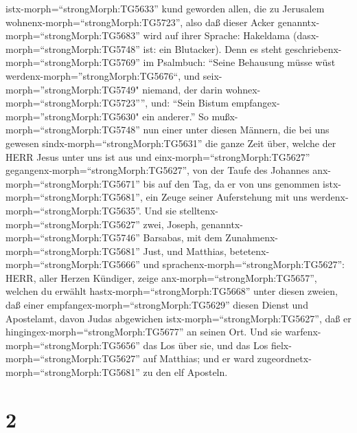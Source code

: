 istx-morph=``strongMorph:TG5633'' kund geworden allen, die zu Jerusalem
wohnenx-morph=``strongMorph:TG5723'', also daß dieser Acker
genanntx-morph=``strongMorph:TG5683'' wird auf ihrer Sprache: Hakeldama
(dasx-morph=``strongMorph:TG5748'' ist: ein Blutacker). 
Denn es steht geschriebenx-morph=``strongMorph:TG5769'' im Psalmbuch:
``Seine Behausung müsse wüst werdenx-morph=''strongMorph:TG5676``, und
seix-morph=''strongMorph:TG5749" niemand, der darin
wohnex-morph=``strongMorph:TG5723'''', und: ``Sein Bistum
empfangex-morph=''strongMorph:TG5630" ein anderer.''  So
mußx-morph=``strongMorph:TG5748'' nun einer unter diesen Männern, die
bei uns gewesen sindx-morph=``strongMorph:TG5631'' die ganze Zeit über,
welche der HERR Jesus unter uns ist aus und
einx-morph=``strongMorph:TG5627''
gegangenx-morph=``strongMorph:TG5627'',  von der Taufe des
Johannes anx-morph=``strongMorph:TG5671'' bis auf den Tag, da er von uns
genommen istx-morph=``strongMorph:TG5681'', ein Zeuge seiner
Auferstehung mit uns werdenx-morph=``strongMorph:TG5635''. 
Und sie stelltenx-morph=``strongMorph:TG5627'' zwei, Joseph,
genanntx-morph=``strongMorph:TG5746'' Barsabas, mit dem
Zunahmenx-morph=``strongMorph:TG5681'' Just, und Matthias, 
betetenx-morph=``strongMorph:TG5666'' und
sprachenx-morph=``strongMorph:TG5627'': HERR, aller Herzen Kündiger,
zeige anx-morph=``strongMorph:TG5657'', welchen du erwählt
hastx-morph=``strongMorph:TG5668'' unter diesen zweien, 
daß einer empfangex-morph=``strongMorph:TG5629'' diesen Dienst und
Apostelamt, davon Judas abgewichen istx-morph=``strongMorph:TG5627'',
daß er hingingex-morph=``strongMorph:TG5677'' an seinen Ort.
 Und sie warfenx-morph=``strongMorph:TG5656'' das Los über
sie, und das Los fielx-morph=``strongMorph:TG5627'' auf Matthias; und er
ward zugeordnetx-morph=``strongMorph:TG5681'' zu den elf Aposteln.

\hypertarget{section-1}{%
\section{2}\label{section-1}}

